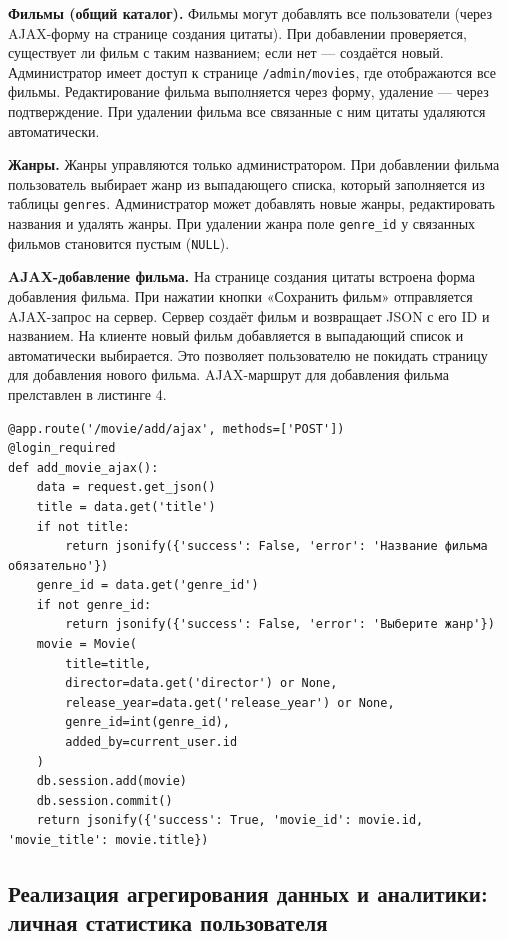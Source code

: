 \textbf{Фильмы (общий каталог).} Фильмы могут добавлять все пользователи (через AJAX-форму 
на странице создания цитаты). При добавлении проверяется, существует ли фильм с таким 
названием; если нет — создаётся новый. Администратор имеет доступ к странице 
\texttt{/admin/movies}, где отображаются все фильмы. Редактирование фильма выполняется 
через форму, удаление — через подтверждение. При удалении фильма все связанные с ним цитаты 
удаляются автоматически.

\textbf{Жанры.} Жанры управляются только администратором. При добавлении фильма пользователь 
выбирает жанр из выпадающего списка, который заполняется из таблицы \texttt{genres}. 
Администратор может добавлять новые жанры, редактировать названия и удалять жанры. При 
удалении жанра поле \texttt{genre\_id} у связанных фильмов становится пустым (\texttt{NULL}).

\textbf{AJAX-добавление фильма.} На странице создания цитаты встроена форма добавления 
фильма. При нажатии кнопки «Сохранить фильм» отправляется AJAX-запрос на сервер. Сервер 
создаёт фильм и возвращает JSON с его ID и названием. На клиенте новый фильм добавляется 
в выпадающий список и автоматически выбирается. Это позволяет пользователю не покидать 
страницу для добавления нового фильма. AJAX-маршрут для добавления фильма прелставлен в 
листинге 4.

\newpage
\begin{lstlisting}[caption={AJAX-добавление фильма (app.py)}, label={lst:ajax_movie}]
@app.route('/movie/add/ajax', methods=['POST'])
@login_required
def add_movie_ajax():
    data = request.get_json()
    title = data.get('title')
    if not title:
        return jsonify({'success': False, 'error': 'Название фильма обязательно'})
    genre_id = data.get('genre_id')
    if not genre_id:
        return jsonify({'success': False, 'error': 'Выберите жанр'})
    movie = Movie(
        title=title,
        director=data.get('director') or None,
        release_year=data.get('release_year') or None,
        genre_id=int(genre_id),
        added_by=current_user.id
    )
    db.session.add(movie)
    db.session.commit()
    return jsonify({'success': True, 'movie_id': movie.id, 'movie_title': movie.title})
\end{lstlisting}

\subsection{Реализация агрегирования данных и аналитики: личная статистика пользователя}

